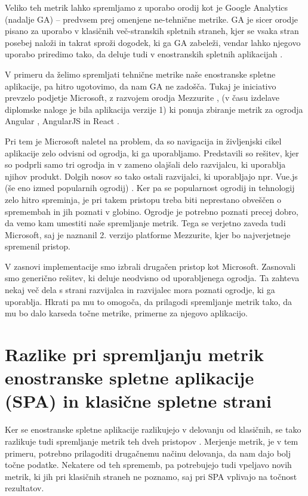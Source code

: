 \documentclass[a4paper, 12pt]{book}
\begin{document}
Veliko teh metrik lahko spremljamo z uporabo orodij kot je Google Analytics \cite{ga_website} (nadalje GA) -- predvsem prej omenjene ne-tehnične metrike. GA je sicer orodje pisano za uporabo v klasičnih več-stranskih spletnih straneh, kjer se vsaka stran posebej naloži in takrat sproži dogodek, ki ga GA zabeleži, vendar lahko njegovo uporabo priredimo tako, da deluje tudi v enostranskih spletnih aplikacijah \cite{ga_spa}.

V primeru da želimo spremljati tehnične metrike naše enostranske spletne aplikacije, pa hitro ugotovimo, da nam GA ne zadošča. Tukaj je iniciativo prevzelo podjetje Microsoft, z razvojem orodja Mezzurite \cite{mezzurite_website}, (v času izdelave diplomske naloge je bila aplikacija verzije 1) ki ponuja zbiranje metrik za ogrodja Angular \cite{angular_website}, AngularJS \cite{angularjs_website} in React \cite{react_website}.

Pri tem je Microsoft naletel na problem, da so navigacija in življenjski cikel aplikacije zelo odvisni od ogrodja, ki ga uporabljamo. Predstavili so rešitev, kjer so podprli samo tri ogrodja in v zameno olajšali delo razvijalcu, ki uporablja njihov produkt. Dolgih nosov so tako ostali razvijalci, ki uporabljajo npr. Vue.js (še eno izmed popularnih ogrodij) \cite{vue_website}. Ker pa se popularnost ogrodij in tehnologij zelo hitro spreminja, je pri takem pristopu treba biti neprestano obveščen o spremembah in jih poznati v globino. Ogrodje je potrebno poznati  precej dobro, da vemo kam umestiti naše spremljanje metrik. Tega se verjetno zaveda tudi Microsoft, saj je naznanil 2. verzijo platforme Mezzurite, kjer bo najverjetneje spremenil pristop.

V zasnovi implementacije smo izbrali drugačen pristop kot Microsoft. Zasnovali smo generično rešitev, ki deluje neodvisno od uporabljenega ogrodja. Ta zahteva nekaj več dela s strani razvijalca in razvijalec mora poznati ogrodje, ki ga uporablja. Hkrati pa mu to omogoča, da prilagodi spremljanje metrik tako, da mu bo dalo karseda točne metrike, primerne za njegovo aplikacijo.

\chapter{Razlike pri spremljanju metrik enostranske spletne aplikacije (SPA) in klasične spletne strani}
\label{ch1}

Ker se enostranske spletne aplikacije razlikujejo v delovanju od klasičnih, se tako razlikuje tudi spremljanje metrik teh dveh pristopov \cite{spa_vs_multi} \cite{spa_blakit}. Merjenje metrik, je v tem primeru, potrebno prilagoditi drugačnemu načinu delovanja, da nam dajo bolj točne podatke. Nekatere od teh sprememb, pa potrebujejo tudi vpeljavo novih metrik, ki jih pri klasičnih straneh ne poznamo, saj pri SPA vplivajo na točnost rezultatov.
\end{document}

